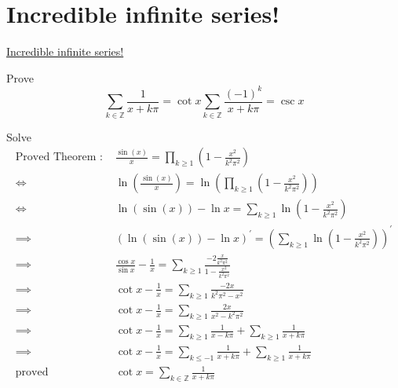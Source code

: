 \documentclass {article}
\begin{document}
\section{Incredible infinite series!}
\href{https://www.youtube.com/watch?v=mL3ftmldMow}{Incredible infinite series!}

Prove \[
  \displaystyle\sum_{k \in \mathbb{Z}} \frac{1}{x + k\pi} = \cot x
  \displaystyle\sum_{k \in \mathbb{Z}} \frac{(-1)^k}{x + k\pi} = \csc x
\]


Solve 
\[
\begin{matrix}
  \text{Proved Theorem :  } & \frac{\sin(x)} {x} = \displaystyle\prod_{k \ge 1} \left(1 - \frac{x^2}{k^2\pi^2}\right) \\
\Longleftrightarrow  & \ln\left( \frac{\sin(x)} {x} \right) = \ln\left(\displaystyle\prod_{k \ge 1} \left(1 - \frac{x^2}{k^2\pi^2}\right) \right) \\
\Longleftrightarrow & \ln(\sin(x)) - \ln x = \displaystyle\sum_{k \ge 1} \ln\left(1 - \frac{x^2}{k^2\pi^2}\right) \\
\implies & \left(\ln(\sin(x)) - \ln x \right)^{'} = \left(\displaystyle\sum_{k \ge 1} \ln\left(1 - \frac{x^2}{k^2\pi^2}\right)\right)^{'} \\
\implies & \frac{\cos x}{\sin x} - \frac{1}{x} = \displaystyle\sum_{k \ge 1} \frac{-2 \frac{x}{k^2\pi^2}} { 1 - \frac{x^2}{k^2\pi^2}} \\
\implies & \cot x - \frac{1}{x} = \displaystyle\sum_{k \ge 1} \frac{-2x}{k^2\pi^2 - x^2} \\
\implies & \cot x - \frac{1}{x} = \displaystyle\sum_{k \ge 1} \frac{2x}{  x^2 - k^2\pi^2} \\
\implies & \cot x - \frac{1}{x} = \displaystyle\sum_{k \ge 1} \frac{1}{  x - k\pi}  + \displaystyle\sum_{k \ge 1} \frac{1}{  x + k\pi} \\
\implies & \cot x - \frac{1}{x} = \displaystyle\sum_{k \le -1} \frac{1}{  x + k\pi}  + \displaystyle\sum_{k \ge 1} \frac{1}{  x + k\pi} \\
\text{proved  } & \cot x = \displaystyle\sum_{k \in \mathbb{Z}} \frac{1}{x + k\pi} \\

\end{matrix}
\]
\end{document}

